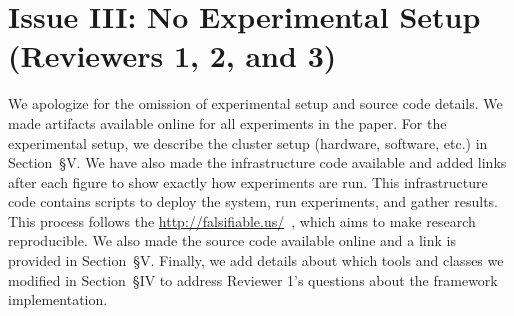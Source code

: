 \documentclass[onecolumn,conference]{IEEEtran}
\begin{document}
\section*{Issue III: No Experimental Setup (Reviewers 1, 2, and 3)}

We apologize for the omission of experimental setup and source code details.
We made artifacts available online for all experiments in the paper. For the
experimental setup, we describe the cluster setup (hardware, software, etc.) in
Section~{\S}V.  We have also made the infrastructure code available and added
links after each figure to show exactly how experiments are run.  This
infrastructure code contains scripts to deploy the system, run experiments, and
gather results.  This process follows the \href{Popper
Convention}{http://falsifiable.us/}~\cite{jimenez_popper_2016}, which aims to
make research reproducible.  We also made the source code available online and
a link is provided in Section~{\S}V. Finally, we add details about which tools
and classes we modified in Section~{\S}IV to address Reviewer 1's questions
about the framework implementation.




\end{document}
